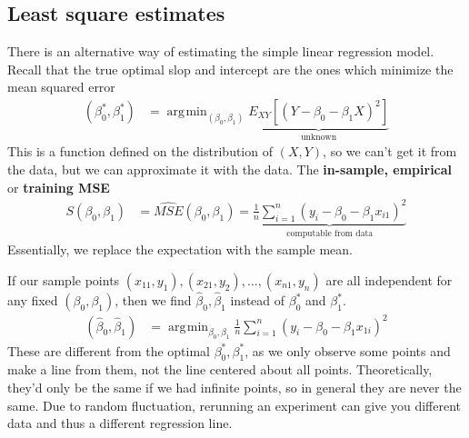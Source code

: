 \documentclass[12 pt]{article}
\DeclareMathOperator*{\argmin}{arg\!\min}
\begin{document}
\subsection{Least square estimates}
There is an alternative way of estimating the simple linear regression
model. Recall that the true optimal slop and intercept are the ones
which minimize the mean squared error
\begin{align*}
  (\beta_0^*, \beta_1^*) & = \argmin_{(\beta_0,\beta_1)} \underbrace{E_{XY} [(Y - \beta_0 - \beta_1 X)^2]}_{\text{unknown}}
\end{align*}
This is a function defined on the distribution of $(X,Y)$, so we can't
get it from the data, but we can approximate it with the data. The
\textbf{in-sample, empirical} or \textbf{training MSE}
\begin{align*}
  S(\beta_0, \beta_1) & = \widehat{MSE}(\beta_0, \beta_1) =
                        \underbrace{\frac{1}{n} \sum_{i = 1}^n (y_i -
                        \beta_0 - \beta_1 x_{i1})^2}_{\text{computable
                        from data}}
\end{align*}
Essentially, we replace the expectation with the sample mean.

If our sample points $(x_{11}, y_1), (x_{21}, y_2), \ldots,
(x_{n1},y_n)$ are all independent for any fixed $(\beta_0, \beta_1)$,
then we find $\hat{\beta}_0, \hat{\beta}_1$ instead of $\beta_0^*$
and $\beta_1^*$.
\begin{align*}
  (\hat{\beta}_0, \hat{\beta}_1) & = \argmin_{\beta_0, \beta_1} \frac{1}{n} \sum_{i=1}^n (y_i - \beta_0 - \beta_1 x_{1i})^2
\end{align*}
These are different from the optimal $\beta_0^*, \beta_1^*$, as we
only observe some points and make a line from them, not the line
centered about all points. Theoretically, they'd only be the same if
we had infinite points, so in general they are never the same. Due to
random fluctuation, rerunning an experiment can give you different
data and thus a different regression line.
\end{document}
